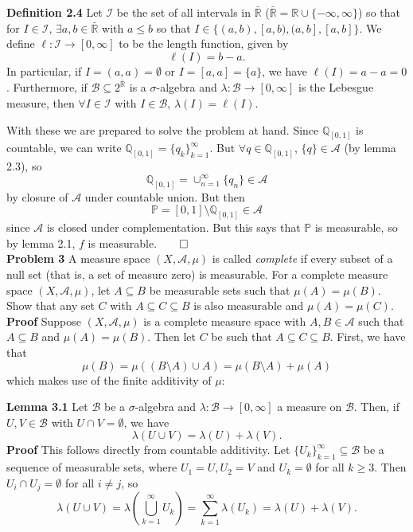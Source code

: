 \documentclass[11pt, letterpaper]{article}
\newcommand{\mbb}[1]{\mathbb{#1}}
\newcommand{\mc}[1]{\mathcal{#1}}
\begin{document}
    \begin{center}
        \begin{minipage}[c]{0.85\linewidth}
            {\bf Definition 2.4} Let $\mc{I}$ be the set of all intervals in $\bar{\mbb{R}}$ ($\bar{\mbb{R}}=\mbb{R}\cup\{-\infty,\infty\}$) so that for $I\in\mc{I}$, $\exists a,b\in\bar{\mbb{R}}$ with $a\leq b$ so that $I\in\{(a,b),[a,b),(a,b],[a,b]\}$. We define $\ell:\mc{I}\rightarrow[0,\infty]$ to be the length function, given by
            \[\ell(I)=b-a.\]
            In particular, if $I=(a,a)=\emptyset$ or $I=[a,a]=\{a\}$, we have $\ell(I)=a-a=0$. Furthermore, if $\mc{B}\subseteq 2^{\bar{\mbb{R}}}$ is a $\sigma$-algebra and $\lambda:\mc{B}\rightarrow[0,\infty]$ is the Lebesgue measure, then $\forall I\in\mc{I}$ with $I\in\mc{B}$, $\lambda(I)=\ell(I)$. 
        \end{minipage}
    \end{center}\vspace{10pt}
    With these we are prepared to solve the problem at hand. Since $\mbb{Q}_{[0,1]}$ is countable, we can write $\mbb{Q}_{[0,1]}=\{q_k\}_{k=1}^\infty$. 
    But $\forall q\in\mbb{Q}_{[0,1]}$, $\{q\}\in\mc{A}$ (by lemma 2.3), so
    \[\mbb{Q}_{[0,1]}=\cup_{n=1}^\infty\{q_n\}\in\mc{A}\]
    by closure of $\mc{A}$ under countable union. But then
    \[\mbb{P}=[0,1]\setminus\mbb{Q}_{[0,1]}\in\mc{A}\]
    since $\mc{A}$ is closed under complementation. But this says that $\mbb{P}$ is measurable, so by lemma 2.1, $f$ is measurable.\hfill{$\qed$}\\[10pt]
    {\bf Problem 3} A measure space $(X,\mc{A},\mu)$ is called {\it complete} if every subset of a null set (that is, a set of measure zero) is measurable.
    For a complete measure space $(X,\mc{A},\mu)$, let $A\subseteq B$ be measurable sets such that $\mu(A)=\mu(B)$. Show that any set $C$ with $A\subseteq C\subseteq B$
    is also measurable and $\mu(A)=\mu(C)$.\\[10pt]
    {\bf Proof} Suppose $(X,\mc{A},\mu)$ is a complete measure space with $A,B\in\mc{A}$ such that $A\subseteq B$ and $\mu(A)=\mu(B)$. Then let $C$ be such that $A\subseteq C\subseteq B$. First, we have that
    \[\mu(B)=\mu((B\setminus A)\cup A)=\mu(B\setminus A)+\mu(A)\tag{since $(B\setminus A)\cap A=\emptyset$}\] 
    which makes use of the finite additivity of $\mu$:
    \begin{center}
        \begin{minipage}[c]{0.85\linewidth}
            {\bf Lemma 3.1} Let $\mc{B}$ be a $\sigma$-algebra and $\lambda:\mc{B}\rightarrow[0,\infty]$ a measure on $\mc{B}$. Then, if $U,V\in\mc{B}$ with $U\cap V=\emptyset$, we have
            \[\lambda(U\cup V)=\lambda(U)+\lambda(V).\]
            {\bf Proof} This follows directly from countable additivity. Let $\{U_k\}_{k=1}^\infty\subseteq\mc{B}$ be a sequence of measurable sets, where $U_1=U, U_2=V$ and $U_k=\emptyset$ for all $k\geq 3$.
            Then $U_i\cap U_j=\emptyset$ for all $i\neq j$, so
            \[\lambda(U\cup V)=\lambda\left(\bigcup_{k=1}^\infty U_k\right)=\sum_{k=1}^\infty\lambda(U_k)=\lambda(U)+\lambda(V).\tag*{$\qed$}\]
            \end{minipage}
    \end{center}\vspace{10pt}
\end{document}
